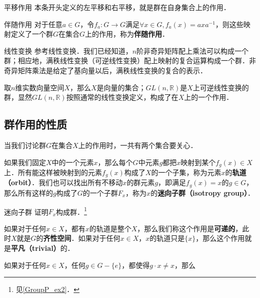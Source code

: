 \begin{example}{平移作用}\label{Group3_ex1}
本条开头定义的左平移和右平移，就是群在自身集合上的作用．
\end{example}

\begin{example}{伴随作用}\label{Group3_ex2}
对于任意$a\in G$，令$f_a: G\rightarrow G$满足$\forall x\in G, f_a(x)=axa^{-1}$，则这些映射定义了一个群$G$在集合$G$上的作用，称为\textbf{伴随作用}．
\end{example}

\begin{example}{线性变换}\label{Group3_ex3}
参考线性变换．我们已经知道，$n$阶非奇异矩阵配上乘法可以构成一个群；相应地，满秩线性变换（可逆线性变换）配上映射的复合运算构成一个群．非奇异矩阵乘法是给定了基向量以后，满秩线性变换的复合的表示．

取$n$维实数向量空间$X$，那么$X$是向量的集合；$GL(n,\mathbb{R})$是$X$上可逆线性变换的群，显然$GL(n,\mathbb{R})$按照通常的线性变换定义，构成了在$X$上的一个作用．
\end{example}

\subsection{群作用的性质}

当我们讨论群$G$在集合$X$上的作用时，一共有两个集合要关心．

如果我们固定$X$中的一个元素$x$，那么每个$G$中元素$g$都把$x$映射到某个$f_g(x)\in X$上．所有能这样被映射到的元素$f_g(x)$构成了$X$的一个子集，称为元素$x$的\textbf{轨道（orbit）}．我们也可以找出所有不移动$x$的群元素$g$，即满足$f_g(x)=x$的$g\in G$，那么所有这样的$g$构成了$G$的一个子群$F_x$，称为$x$的\textbf{迷向子群（isotropy group）}．

\begin{exercise}{迷向子群}\label{Group3_exe1}
证明$F_x$构成群．\footnote{见\autoref{GroupP_ex2}．}
\end{exercise}

如果对于任何$x\in X$，都有$x$的轨道是整个$X$，那么我们称这个作用是\textbf{可递的}，此时$X$就是$G$的\textbf{齐性空间}．如果对于任何$x\in X$，$x$的轨道只是$\{x\}$，那么这个作用就是\textbf{平凡（trivial）}的．

如果对于任何$x\in X$，任何$g\in G-\{e\}$，都使得$g\cdot x\not=x$，那么
